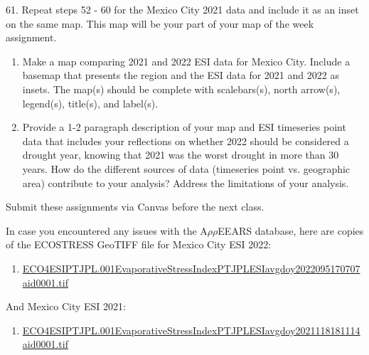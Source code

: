 \documentclass[oneside,a4paper,11pt,explicit]{book}
\begin{document}
61. Repeat steps 52 - 60 for the Mexico City 2021 data and include it as an inset on the same map. This map will be your part of your map of the week assignment.

\begin{tcolorbox}[colback=yellow!5!white,colframe=IceCreamOrbit,title= \vspace{.2em} \Large Map of the Week Assignments]
	\large
	\begin{enumerate}
		\item Make a map comparing 2021 and 2022 ESI data for Mexico City. Include a basemap that presents the region and the ESI data for 2021 and 2022 as insets. The map(s) should be complete with scalebars(s), north arrow(s), legend(s), title(s), and label(s).
        \item Provide a 1-2 paragraph description of your map and ESI timeseries point data that includes your reflections on whether 2022 should be considered a drought year, knowing that 2021 was the worst drought in more than 30 years. How do the different sources of data (timeseries point vs. geographic area) contribute to your analysis? Address the limitations of your analysis.
	\end{enumerate}
	Submit these assignments via Canvas before the next class.
\end{tcolorbox}

\begin{tcolorbox}[colback=yellow!5!white,title=\textbf{Datafiles}]
	\large
	In case you encountered any issues with the A$\rho\rho$EEARS database, here are copies of the ECOSTRESS GeoTIFF file for Mexico City ESI 2022:
	\begin{enumerate}
		\item \href{https://jeremydforsythe.github.io/icecream-tutorials/Tutorial8_ESI/ECO4ESIPTJPL.001_Evaporative_Stress_Index_PT_JPL_ESIavg_doy2022095170707_aid0001.tif}{\small ECO4ESIPTJPL.001\textunderscore Evaporative\textunderscore Stress\textunderscore Index\textunderscore PT\textunderscore JPL\textunderscore ESIavg\textunderscore doy2022095170707\textunderscore aid0001.tif}
	\end{enumerate}
	And Mexico City ESI 2021:
	\begin{enumerate}
		\item \href{https://jeremydforsythe.github.io/icecream-tutorials/Tutorial8_ESI/ECO4ESIPTJPL.001_Evaporative_Stress_Index_PT_JPL_ESIavg_doy2021118181114_aid0001.tif}{\small ECO4ESIPTJPL.001\textunderscore Evaporative\textunderscore Stress\textunderscore Index\textunderscore PT\textunderscore JPL\textunderscore ESIavg\textunderscore doy2021118181114\textunderscore aid0001.tif}
	\end{enumerate}
\end{tcolorbox}
\end{document}
